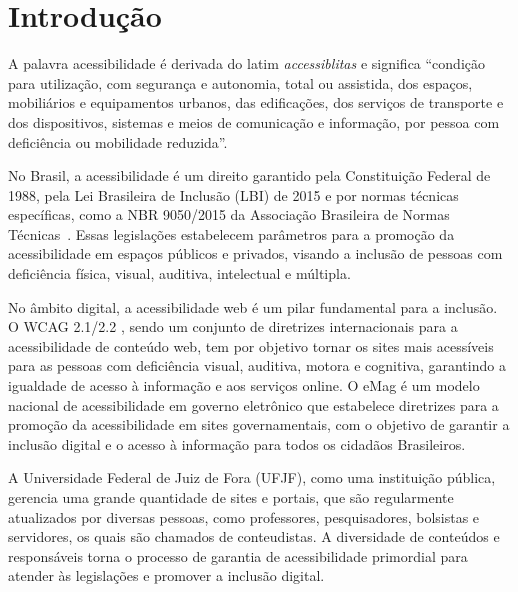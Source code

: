 \documentclass[
	article,			%
	12pt,				%
	oneside,			%
	a4paper,			%
	section=TITLE,		%
	subsection=TITLE,	%
	english,			%
	brazil,				%
	sumario=tradicional
	]{abntex2}
\begin{document}
\textual

\section{Introdução}

A palavra acessibilidade é derivada do latim \textit{accessiblitas}
e significa ``condição para utilização, com segurança e autonomia,
total ou assistida, dos espaços, mobiliários e equipamentos urbanos, das
edificações, dos serviços de transporte e dos dispositivos, sistemas e meios de
comunicação e informação, por pessoa com deficiência ou mobilidade reduzida''\cite{CD}.

No Brasil, a acessibilidade é um direito garantido pela Constituição
Federal de 1988, pela Lei Brasileira de Inclusão (LBI) de 2015 \cite{LBI}
e por normas técnicas específicas, como a NBR 9050/2015 da Associação
Brasileira de Normas Técnicas~\cite{ABNT}. Essas legislações estabelecem
parâmetros para a promoção da acessibilidade em espaços públicos e privados,
visando a inclusão de pessoas com deficiência física, visual, auditiva,
intelectual e múltipla.

No âmbito digital, a acessibilidade web é um pilar fundamental para a
inclusão. O WCAG 2.1/2.2 \cite{wcag22}, sendo um conjunto de diretrizes
internacionais para a acessibilidade de conteúdo web, tem por objetivo 
tornar os sites mais acessíveis para as pessoas com deficiência visual, auditiva,
motora e cognitiva, garantindo a igualdade de acesso à informação e aos
serviços online. O eMag é um modelo nacional de acessibilidade em governo
eletrônico que estabelece diretrizes para a promoção da acessibilidade em
sites governamentais, com o objetivo de garantir a inclusão digital e o acesso
à informação para todos os cidadãos Brasileiros.

A Universidade Federal de Juiz de Fora (UFJF), como uma instituição pública,
gerencia uma grande quantidade de sites e portais, que são regularmente
atualizados por diversas pessoas, como professores, pesquisadores, bolsistas e
servidores, os quais são chamados de conteudistas. A diversidade de conteúdos e
responsáveis torna o processo de garantia de acessibilidade primordial para
atender às legislações e promover a inclusão digital.
\end{document}
